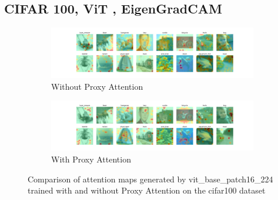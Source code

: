 \subsection{CIFAR 100, ViT , EigenGradCAM}

\begin{figure}[!htb]
    \centering
    \begin{subfigure}[b]{1\textwidth}
        \includegraphics[width=\textwidth]{images/gpp_cifar100_vit_base_patch16_224_noproxy_1.pdf}
        \caption{Without Proxy Attention}
    \end{subfigure}
    \hfill
    \begin{subfigure}[b]{1\textwidth}
        \includegraphics[width=\textwidth]{images/gpp_cifar100_vit_base_patch16_224_proxy_1.pdf}
        \caption{With Proxy Attention}
    \end{subfigure}
    \caption{Comparison of attention maps generated by vit\_base\_patch16\_224 trained with and without Proxy Attention on the cifar100 dataset}
\end{figure}


